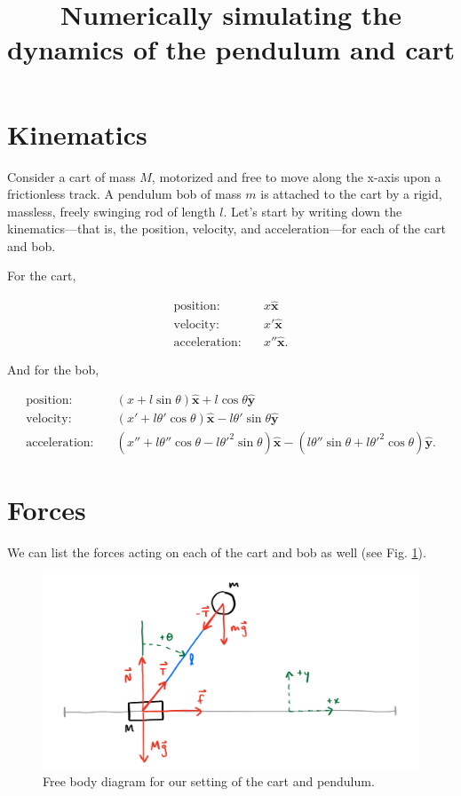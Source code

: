 \documentclass[12pt]{article}
\title{Numerically simulating the dynamics of the pendulum and cart}
\date{}
\begin{document}
\maketitle

\section{Kinematics}

Consider a cart of mass $M$, motorized and free to move along the x-axis upon a frictionless track. A pendulum bob of mass $m$ is attached to the cart by a rigid, massless, freely swinging rod of length $l$. Let's start by writing down the kinematics---that is, the position, velocity, and acceleration---for each of the cart and bob.

For the cart,

\begin{align}
\mbox{position:} &\quad x \mathbf{\hat{x}} \nonumber\\[5pt]
\mbox{velocity:} &\quad x' \mathbf{\hat{x}} \nonumber\\[5pt]
\mbox{acceleration:} &\quad x'' \mathbf{\hat{x}}. \nonumber
\end{align}

And for the bob,

\begin{align}
\mbox{position:} &\quad (x + l \sin{\theta}) \mathbf{\hat{x}} + l \cos{\theta} \mathbf{\hat{y}} \nonumber\\[5pt]
\mbox{velocity:} &\quad (x' + l \theta' \cos{\theta}) \mathbf{\hat{x}} - l \theta' \sin{\theta} \mathbf{\hat{y}} \nonumber\\[5pt]
\mbox{acceleration:} &\quad (x'' + l \theta'' \cos{\theta} - l \theta'^2 \sin{\theta}) \mathbf{\hat{x}} - (l \theta'' \sin{\theta} + l \theta'^2 \cos{\theta}) \mathbf{\hat{y}}. \nonumber
\end{align}

\section{Forces}

We can list the forces acting on each of the cart and bob as well (see Fig. \ref{fig:free_body}).

\begin{figure}
\center
\includegraphics[width=0.9\linewidth]{free_body.png}
\caption{Free body diagram for our setting of the cart and pendulum.}
\label{fig:free_body}
\end{figure}
\end{document}
